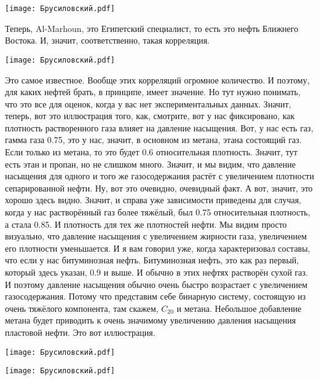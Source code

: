 \documentclass[main.tex]{subfiles}
\begin{document}
\begin{center}
\texttt{[image: Брусиловский.pdf]}
\end{center}

Теперь, Al-Marhoun, это Египетский специалист, то есть это нефть Ближнего Востока.
И, значит, соответственно, такая корреляция.

\begin{center}
\texttt{[image: Брусиловский.pdf]}
\end{center}

Это самое известное. Вообще этих корреляций огромное количество.
И поэтому, для каких нефтей брать, в принципе, имеет значение.
Но тут нужно понимать, что это все для оценок, когда у вас нет экспериментальных данных.
Значит, теперь, вот это иллюстрация того, как, смотрите, вот у нас фиксировано, как плотность растворенного газа влияет на давление насыщения.
Вот, у нас есть газ, гамма газа 0.75, это у нас, значит, в основном из метана, этана состоящий газ.
Если только из метана, то это будет 0.6 относительная плотность.
Значит, тут есть этан и пропан, но не слишком много.
Значит, и мы видим, что давление насыщения для одного и того же газосодержания растёт с увеличением плотности сепарированной нефти.
Ну, вот это очевидно, очевидный факт.
А вот, значит, это хорошо здесь видно.
Значит, и справа уже зависимости приведены для случая, когда у нас растворённый газ более тяжёлый, был 0.75 относительная плотность, а стала 0.85.
И плотность для тех же плотностей нефти.
Мы видим просто визуально, что давление насыщения с увеличением жирности газа, увеличением его плотности уменьшается.
И я вам говорил уже, когда характеризовал составы, что если у нас битуминозная нефть.
Битуминозная нефть, это как раз первый, который здесь указан, 0.9 и выше.
И обычно в этих нефтях растворён сухой газ.
И поэтому давление насыщения обычно очень быстро возрастает с увеличением газосодержания.
Потому что представим себе бинарную систему, состоящую из очень тяжёлого компонента, там скажем, $C_{20}$ и метана.
Небольшое добавление метана будет приводить к очень значимому увеличению давления насыщения пластовой нефти.
Это вот иллюстрация.

\begin{center}
\texttt{[image: Брусиловский.pdf]}
\end{center}

\begin{center}
\texttt{[image: Брусиловский.pdf]}
\end{center}
\end{document}
